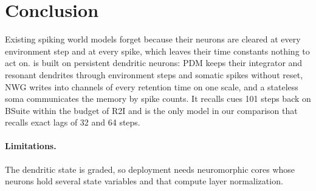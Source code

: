 \section{Conclusion}
\label{sec:conclusion}

Existing spiking world models forget because their neurons are cleared at every environment step and at every spike, which leaves their time constants nothing to act on.
\method is built on persistent dendritic neurons: PDM keeps their integrator and resonant dendrites through environment steps and somatic spikes without reset, NWG writes into channels of every retention time on one scale, and a stateless soma communicates the memory by spike counts.
It recalls cues 101 steps back on BSuite within the budget of R2I and is the only model in our comparison that recalls exact lags of 32 and 64 steps.

\paragraph{Limitations.}
The dendritic state is graded, so deployment needs neuromorphic cores whose neurons hold several state variables and that compute layer normalization.
